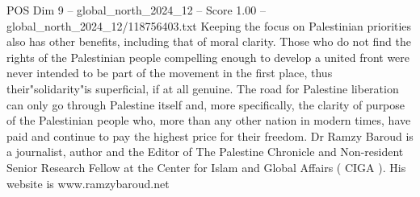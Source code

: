 \begin{textsample}{POS Dim 9 – global\_north\_2024\_12 – Score 1.00 – global\_north\_2024\_12/118756403.txt}
Keeping the focus on Palestinian priorities also has other benefits, including that of moral clarity.
Those who do not find the rights of the Palestinian people compelling enough to develop a united front were never intended to be part of the movement in the first place, thus their"solidarity"is superficial, if at all genuine.
The road for Palestine liberation can only go through Palestine itself and, more specifically, the clarity of purpose of the Palestinian people who, more than any other nation in modern times, have paid and continue to pay the highest price for their freedom.
Dr Ramzy Baroud is a journalist, author and the Editor of The Palestine Chronicle and Non-resident Senior Research Fellow at the Center for Islam and Global Affairs ( CIGA ).
His website is www.ramzybaroud.net

\end{textsample}
